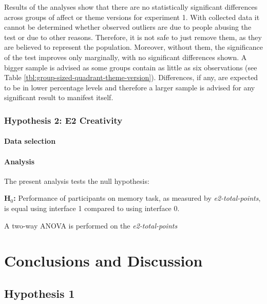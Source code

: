 		Results of the analyses show that there are no statistically significant differences across groups of affect or theme versions for experiment 1. With collected data it cannot be determined whether observed outliers are due to people abusing the test or due to other reasons. Therefore, it is not safe to just remove them, as they are believed to represent the population. Moreover, without them, the significance of the test improves only marginally, with no significant differences shown. A bigger sample is advised as some groups contain as little as six observations (see Table \ref{tbl:group-sized-quadrant-theme-version}). Differences, if any, are expected to be in lower percentage levels and therefore a larger sample is advised for any significant result to manifest itself.
		

	
	\subsubsection{Hypothesis 2: E2 Creativity}
	
	\paragraph{Data selection}
	
	\paragraph{Analysis}
	
	The present analysis tests the null hypothesis:
	
	\textbf{H$_{0}$:} Performance of participants on memory task, as measured by \textit{e2-total-points}, is equal using interface 1 compared to using interface 0.
	
	A two-way ANOVA is performed on the \textit{e2-total-points}
	
	
	
\section{Conclusions and Discussion}

	\subsection{Hypothesis 1}
	
